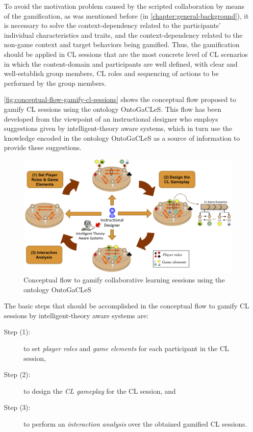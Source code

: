 To avoid the motivation problem caused by the scripted collaboration by means of the gamification, as was mentioned before (in \autoref{chapter:general-background}), it is necessary to solve the context-dependency related to the participants' individual characteristics and traits, and the context-dependency related to the non-game context and target behaviors being gamified. Thus, the gamification should be applied in CL sessions that are the most concrete level of CL scenarios in which the content-domain and participants are well defined, with clear and well-establish group members, CL roles and sequencing of actions to be performed by the group members. 

\autoref{fig:conceptual-flow-gamify-cl-sessions} shows the conceptual flow proposed to gamify CL sessions using the ontology OntoGaCLeS. This flow has been developed from the viewpoint of an instructional designer who employs suggestions given by intelligent-theory aware systems, which in turn use the knowledge encoded in the ontology OntoGaCLeS as a source of information to provide these suggestions.

\begin{figure}[htb]
 \caption{Conceptual flow to gamify collaborative learning sessions using the ontology OntoGaCLeS}
 \label{fig:conceptual-flow-gamify-cl-sessions}
 \centering
 \includegraphics[width=1\textwidth]{images/chap-mechanisms-procedures/conceptual-flow-gamify-cl-sessions.png}
 \fautor
\end{figure}

The basic steps that should be accomplished in the conceptual flow to gamify CL sessions by intelligent-theory aware systems are:

\begin{description}
\item[Step (1):] to set \emph{player roles} and \emph{game elements} for each participant in the CL session,
\item[Step (2):] to design the \emph{CL gameplay} for the CL session, and
\item[Step (3):] to perform an \emph{interaction analysis} over the obtained gamified CL sessions.
\end{description}

